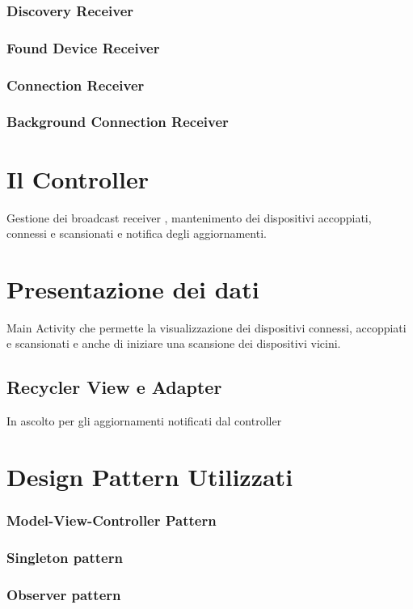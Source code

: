 \subsubsection{Discovery Receiver}

\subsubsection{Found Device Receiver}

\subsubsection{Connection Receiver}

\subsubsection{Background Connection Receiver}


\section{Il Controller}
Gestione dei broadcast receiver , mantenimento dei dispositivi accoppiati, connessi e scansionati e notifica degli aggiornamenti.


\section{Presentazione dei dati}
Main Activity che permette la visualizzazione dei dispositivi connessi, accoppiati e scansionati e anche di iniziare una scansione dei dispositivi vicini.

\subsection{Recycler View e Adapter}
In ascolto per gli aggiornamenti notificati dal controller


\section{Design Pattern Utilizzati}
\subsubsection{Model-View-Controller Pattern}
\subsubsection{Singleton pattern}
\subsubsection{Observer pattern}
